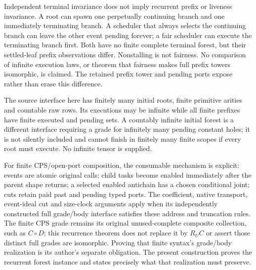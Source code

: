 \documentclass[11pt]{article}
\begin{document}
Independent terminal invariance does not imply recurrent prefix or liveness invariance. A root can spawn one perpetually continuing branch and one immediately terminating branch. A scheduler that always selects the continuing branch can leave the other event pending forever; a fair scheduler can execute the terminating branch first. Both have no finite complete terminal forest, but their settled-leaf prefix observations differ. Nonstalling is not fairness. No comparison of infinite execution laws, or theorem that fairness makes full prefix towers isomorphic, is claimed. The retained prefix tower and pending ports expose rather than erase this difference.

The source interface here has finitely many initial roots, finite primitive arities and countable raw rows. Its executions may be infinite while all finite prefixes have finite executed and pending sets. A countably infinite initial forest is a different interface requiring a grade for infinitely many pending constant holes; it is not silently included and cannot finish in finitely many finite scopes if every root must execute. No infinite tensor is supplied.

For finite CPS/open-port composition, the consumable mechanism is explicit: events are atomic original calls; child tasks become enabled immediately after the parent shape returns; a selected enabled antichain has a chosen conditional joint; cuts retain paid past and pending typed ports. The coefficient, native transport, event-ideal cut and size-clock arguments apply when its independently constructed full grade/body interface satisfies these address and truncation rules. The finite CPS grade remains its original unused-complete composite collection, such as $C\circ D$; this recurrence theorem does not replace it by $R_UC$ or assert those distinct full grades are isomorphic. Proving that finite syntax's grade/body realization is its author's separate obligation. The present construction proves the recurrent forest instance and states precisely what that realization must preserve.
\end{document}
